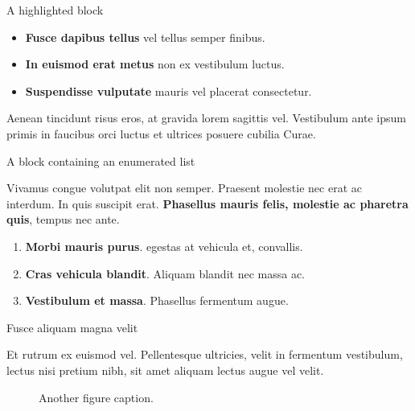 \documentclass[final]{beamer}
\newlength{\colwidth}
\begin{document}
\begin{frame}[t]
\begin{columns}[t]
\begin{column}{\colwidth}
\begin{coralblock}{A highlighted block}
    \begin{itemize}
      \item \textbf{Fusce dapibus tellus} vel tellus semper finibus.
      \item \textbf{In euismod erat metus} non ex vestibulum luctus.
      \item \textbf{Suspendisse vulputate} mauris vel placerat consectetur.
    \end{itemize}

    Aenean tincidunt risus eros, at gravida lorem sagittis vel. Vestibulum ante
    ipsum primis in faucibus orci luctus et ultrices posuere cubilia Curae.

  \end{coralblock}

  \begin{block}{A block containing an enumerated list}

    Vivamus congue volutpat elit non semper. Praesent molestie nec erat ac
    interdum. In quis suscipit erat. \textbf{Phasellus mauris felis, molestie
    ac pharetra quis}, tempus nec ante.

    \begin{enumerate}
      \item \textbf{Morbi mauris purus}. egestas at vehicula et, convallis.
      \item \textbf{Cras vehicula blandit}. Aliquam blandit nec massa ac.
      \item \textbf{Vestibulum et massa}. Phasellus fermentum augue.
    \end{enumerate}

  \end{block}

  \begin{block}{Fusce aliquam magna velit}

    Et rutrum ex euismod vel. Pellentesque ultricies, velit in fermentum
    vestibulum, lectus nisi pretium nibh, sit amet aliquam lectus augue vel
    velit.

    \begin{figure}
      \centering
      \caption{Another figure caption.}
    \end{figure}


\end{block}
\end{column}
\end{columns}
\end{frame}
\end{document}
